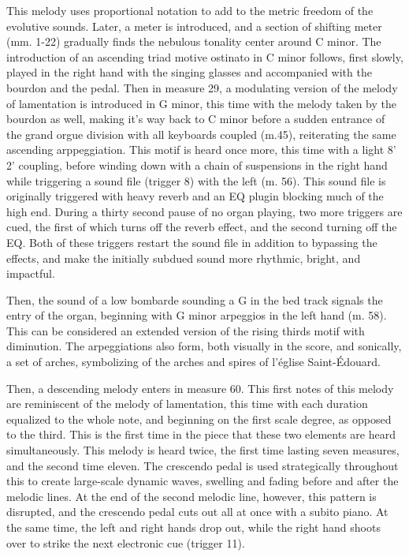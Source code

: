 \documentclass[12pt,twoside,maitrise]{dms_ks}
\theoremstyle{definition}
\begin{document}
{This melody uses proportional notation to add to the metric freedom of the evolutive sounds. Later, a meter is introduced, and a section of shifting meter (mm. 1-22) gradually finds the nebulous tonality center around C minor.
The introduction of an ascending triad motive ostinato in C minor follows, first slowly, played in the right hand with the singing glasses and accompanied with the bourdon and the pedal. Then in measure 29, a modulating version of the melody of lamentation is introduced in G minor, this time with the melody taken by the bourdon as well, making it's way back to C minor before a sudden entrance of the grand orgue division with all keyboards coupled (m.45), reiterating the same ascending arppeggiation. This motif is heard once more, this time with a light 8' 2' coupling, before winding down with a chain of suspensions in the right hand while triggering a sound file (trigger 8) with the left (m. 56). This sound file is originally triggered with heavy reverb and an EQ plugin blocking much of the high end. During a thirty second pause of no organ playing, two more triggers are cued, the first of which turns off the reverb effect, and the second turning off the EQ. Both of these triggers restart the sound file in addition to bypassing the effects, and make the initially subdued sound more rhythmic, bright, and impactful. 



Then, the sound of a low bombarde sounding a G in the bed track signals the entry of the organ, beginning with G minor arpeggios in the left hand (m. 58). This can be considered an extended version of the rising thirds motif with diminution. 
The arpeggiations also form, both visually in the score, and sonically, a set of arches, symbolizing of the arches and spires of l'église Saint-Édouard.


Then, a descending melody enters in measure 60. This first notes of this melody are reminiscent of the melody of lamentation, this time with each duration equalized to the whole note, and beginning on the first scale degree, as opposed to the third. This is the first time in the piece that these two elements are heard simultaneously. This melody is heard twice, the first time lasting seven measures, and the second time eleven. The crescendo pedal is used strategically throughout this to create large-scale dynamic waves, swelling and fading before and after the melodic lines. At the end of the second melodic line, however, this pattern is disrupted, and the crescendo pedal cuts out all at once with a subito piano. At the same time, the left and right hands drop out, while the right hand shoots over to strike the next electronic cue (trigger 11). 

}
\end{document}
